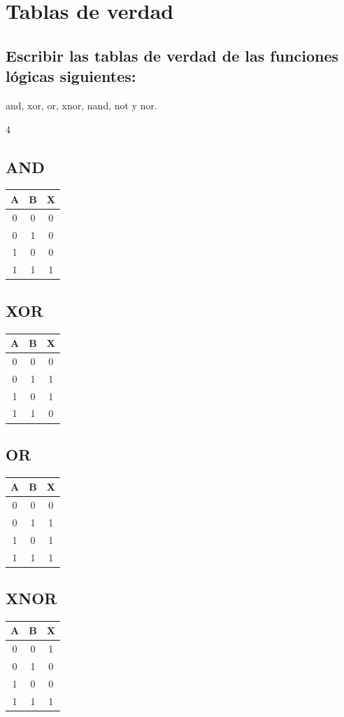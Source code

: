 \section{Tablas de verdad}
\subsection{Escribir las tablas de verdad de las funciones lógicas siguientes:} 
and, xor, or, xnor, nand, not y nor.

\begin{multicols}{4}

\subsection*{AND}
\begin{tabular}{c c | c}
\toprule
A & B & X \\
\midrule
0 & 0 & 0 \\
0 & 1 & 0 \\
1 & 0 & 0 \\
1 & 1 & 1 \\
\bottomrule
\end{tabular}

\subsection*{XOR}
\begin{tabular}{c c | c}
\toprule
A & B & X \\
\midrule
0 & 0 & 0 \\
0 & 1 & 1 \\
1 & 0 & 1 \\
1 & 1 & 0 \\
\bottomrule
\end{tabular}

\subsection*{OR}
\begin{tabular}{c c | c}
\toprule
A & B & X \\
\midrule
0 & 0 & 0 \\
0 & 1 & 1 \\
1 & 0 & 1 \\
1 & 1 & 1 \\
\bottomrule
\end{tabular}

\subsection*{XNOR}
\begin{tabular}{c c | c}
\toprule
A & B & X \\
\midrule
0 & 0 & 1 \\
0 & 1 & 0 \\
1 & 0 & 0 \\
1 & 1 & 1 \\
\bottomrule
\end{tabular}


\end{multicols}
